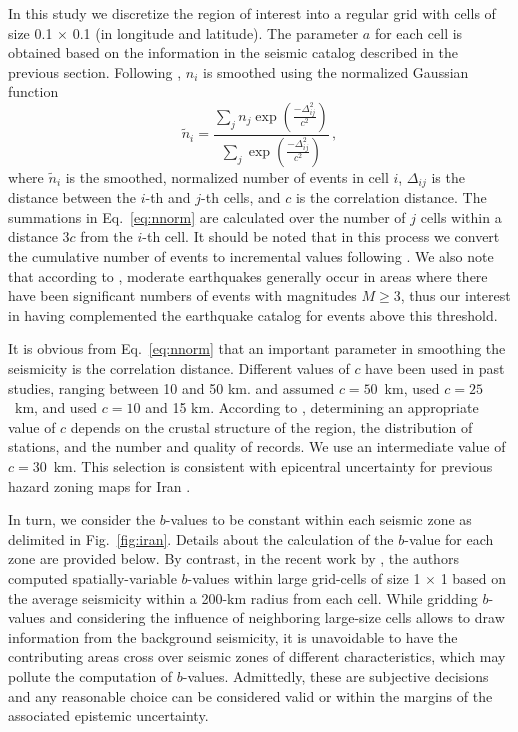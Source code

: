 In this study we discretize the region of interest into a regular grid with cells of size 0.1\textdegree{} $\times$ 0.1\textdegree{} (in longitude and latitude). The parameter $a$ for each cell is obtained based on the information in the seismic catalog described in the previous section. Following \citet{Frankel1995}, $n_i$ is smoothed using the normalized Gaussian function
% 
\begin{equation}
	\tilde{n}_i = \frac
		{ \sum_{j} n_{j} \exp ( \frac{ -\Delta_{ij}^{2} }{ c^2 } ) }
		{ \sum_{j} \exp ( \frac{ -\Delta_{ij}^{2} }{ c^2 } ) }
	\, ,
	\label{eq:nnorm}
\end{equation}
% 
where $\tilde{n}_i$ is the smoothed, normalized number of events in cell $i$, $\Delta_{ij}$ is the distance between the $i$-th and $j$-th cells, and $c$ is the correlation distance. The summations in Eq.~\ref{eq:nnorm} are calculated over the number of $j$ cells within a distance $3c$ from the $i$-th cell. It should be noted that in this process we convert the cumulative number of events to incremental values following \citet{Herrmann1977}. We also note that according to \citet{Frankel1995}, moderate earthquakes generally occur in areas where there have been significant numbers of events with magnitudes $M \geq 3$, thus our interest in having complemented the earthquake catalog for events above this threshold.

It is obvious from Eq.~\ref{eq:nnorm} that an important parameter in smoothing the seismicity is the correlation distance. Different values of $c$ have been used in past studies, ranging between 10 and 50 km. \citet{Frankel1995} and \citet{Boyd2008} assumed $c=50$~km, \citet{Barani2007} used $c=25$~km, and \citet{Foteva2006} used $c=10$ and 15 km. According to \citet{Mirzaei1997}, determining an appropriate value of $c$ depends on the crustal structure of the region, the distribution of stations, and the number and quality of records. We use an intermediate value of $c=30$~km. This selection is consistent with epicentral uncertainty for previous hazard zoning maps for Iran \citep[see][]{Zare2012}.

In turn, we consider the $b$-values to be constant within each seismic zone as delimited in Fig.~\ref{fig:iran}. Details about the calculation of the $b$-value for each zone are provided below. By contrast, in the recent work by \citet{Khodaverdian_2016_BSSA}, the authors computed spatially-variable $b$-values within large grid-cells of size 1\textdegree{} $\times$ 1\textdegree{} based on the average seismicity within a 200-km radius from each cell. While gridding $b$-values and considering the influence of neighboring large-size cells allows to draw information from the background seismicity, it is unavoidable to have the contributing areas cross over seismic zones of different characteristics, which may pollute the computation of $b$-values. Admittedly, these are subjective decisions and any reasonable choice can be considered valid or within the margins of the associated epistemic uncertainty.

